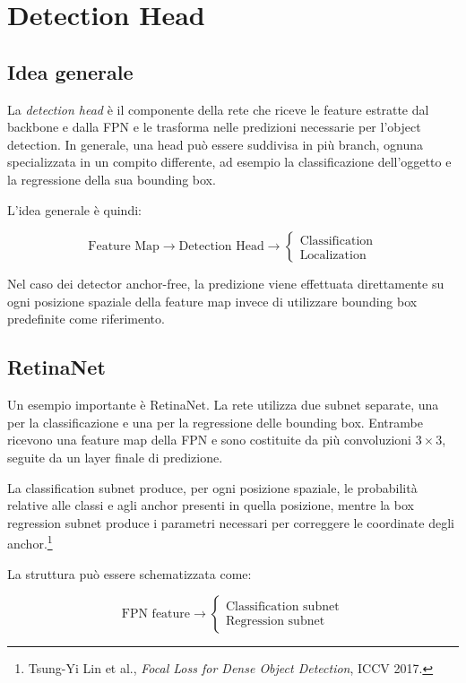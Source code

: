 \section{Detection Head}

\subsection{Idea generale}

La \textit{detection head} è il componente della rete che riceve le feature
estratte dal backbone e dalla FPN e le trasforma nelle predizioni necessarie
per l'object detection. In generale, una head può essere suddivisa in più
branch, ognuna specializzata in un compito differente, ad esempio la
classificazione dell'oggetto e la regressione della sua bounding box.

L'idea generale è quindi:

$$
\text{Feature Map}
\rightarrow
\text{Detection Head}
\rightarrow
\begin{cases}
\text{Classification} \\
\text{Localization}
\end{cases}
$$

Nel caso dei detector anchor-free, la predizione viene effettuata direttamente
su ogni posizione spaziale della feature map invece di utilizzare bounding box
predefinite come riferimento.

\subsection{RetinaNet}

Un esempio importante è RetinaNet. La rete utilizza due subnet separate,
una per la classificazione e una per la regressione delle bounding box.
Entrambe ricevono una feature map della FPN e sono costituite da più
convoluzioni $3\times3$, seguite da un layer finale di predizione.

La classification subnet produce, per ogni posizione spaziale, le probabilità
relative alle classi e agli anchor presenti in quella posizione, mentre la box
regression subnet produce i parametri necessari per correggere le coordinate
degli anchor.\footnote{Tsung-Yi Lin et al., \textit{Focal Loss for Dense Object
Detection}, ICCV 2017.}

La struttura può essere schematizzata come:

$$
\text{FPN feature}
\rightarrow
\begin{cases}
\text{Classification subnet} \\
\text{Regression subnet}
\end{cases}
$$

